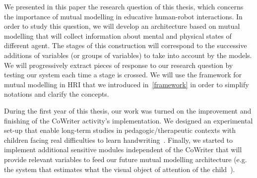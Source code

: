 \documentclass[10pt,a4paper]{article}
\begin{document}
We presented in this paper the research question of this thesis, which concerns the importance of mutual modelling in educative human-robot interactions. In order to study this question, we will develop an architecture based on mutual modelling that will collect information about mental and physical states of different agent. The stages of this construction will correspond to the successive additions of variables (or groups of variables) to take into account by the models. We will progressively extract pieces of response to our research question by testing our system each time a stage is crossed. We will use the framework for mutual modelling in HRI that we introduced in~\ref{framework} in order to simplify notations and clarify the concepts. 

During the first year of this thesis, our work was turned on the improvement and finishing of the CoWriter activity's implementation. We designed an experimental set-up that enable long-term studies in pedagogic/therapeutic contexts with children facing real difficulties to learn handwriting~\cite{jacq2016building}. Finally, we started to implement additional sensitive modules independent of the CoWriter that will provide relevant variables to feed our future mutual modelling architecture (e.g. the system that estimates what the visual object of attention of the child~\cite{lemaignan2016realtime}).



\small
 
\end{document}
